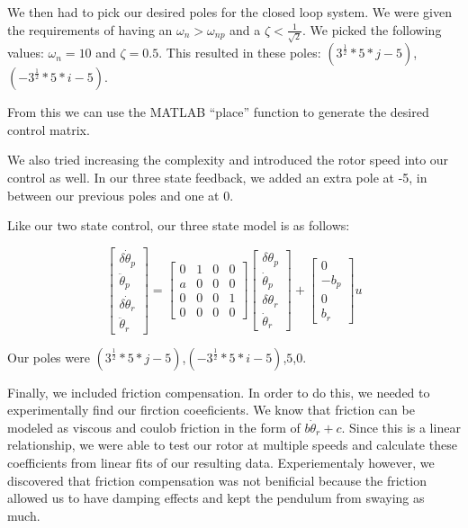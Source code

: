 We then had to pick our desired poles for the closed loop system. We were given the requirements of having an $\omega_n > \omega_{np}$ and a $\zeta < \frac{1}{\sqrt{2}}$. We picked the following values: $\omega_n = 10$ and $\zeta = 0.5$. This resulted in these poles: $(3^\frac{1}{2}*5*j - 5)$,$(-3^\frac{1}{2}*5*i - 5)$.

From this we can use the MATLAB ``place'' function to generate the desired control matrix.

We also tried increasing the complexity and introduced the rotor speed into our control as well. In our three state feedback, we added an extra pole at -5, in between our previous poles and one at 0.

Like our two state control, our three state model is as follows:

$$
\begin{bmatrix}
\delta\dot\theta_p\\
\ddot\theta_p\\
\delta\dot\theta_r\\
\ddot\theta_r
\end{bmatrix}
=
\begin{bmatrix}
0 & 1 & 0 & 0\\
a & 0 & 0 & 0\\
0 & 0 & 0 & 1\\
0 & 0 & 0 & 0
\end{bmatrix}
\begin{bmatrix}
\delta\theta_p\\
\dot\theta_p\\
\delta\theta_r\\
\dot\theta_r
\end{bmatrix}
+
\begin{bmatrix}
0\\
-b_p\\
0\\
b_r
\end{bmatrix}
u$$

Our poles were $(3^\frac{1}{2}*5*j - 5)$,$(-3^\frac{1}{2}*5*i - 5)$,$5$,$0$.

Finally, we included friction compensation. In order to do this, we needed to experimentally find our firction coeeficients. We know that friction can be modeled as viscous and coulob friction in the form of $b\dot\theta_r+c$. Since this is a linear relationship, we were able to test our rotor at multiple speeds and calculate these coefficients from linear fits of our resulting data. Experiementaly however, we discovered that friction compensation was not benificial because the friction allowed us to have damping effects and kept the pendulum from swaying as much.

